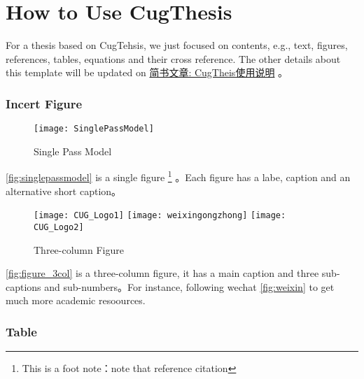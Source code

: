 
\chapter{How to Use CugThesis}

For a thesis based on CugTehsis, we just focused on contents, e.g., text, figures, references, tables, equations and their cross reference. The other details about this template will be updated on \href{https://www.jianshu.com/p/c9bb775fe0f4}{简书文章: CugTheis使用说明}  。

\subsection{Incert Figure}
\begin{figure} [htbp] 
	\centering
	\texttt{[image: SinglePassModel]} 
	\caption[Single-Pass Model]{Single Pass Model} 
	\label{fig:singlepassmodel} 
\end{figure} 

 \autoref{fig:singlepassmodel} is a single figure \footnote{This is a foot note：note that reference citation}
  \citep{andersen2017faulting}。Each figure has a labe, caption and an alternative short caption。
 

\begin{figure} [htbp]
	\centering%
	{\texttt{[image: CUG\_Logo1]} } 
	\hspace{0.01\textwidth} 
	{\texttt{[image: weixingongzhong]} } 
		\hspace{0.01\textwidth} 
	{\texttt{[image: CUG\_Logo2]} } 
	\caption{Three-column Figure} 
	\label{fig:figure_3col} 
\end{figure} 

\autoref{fig:figure_3col} is a three-column figure, it has a main caption and three sub-captions and sub-numbers。For instance, following wechat \ref{fig:weixin} to get much more academic resoources. 


\subsection{Table}

